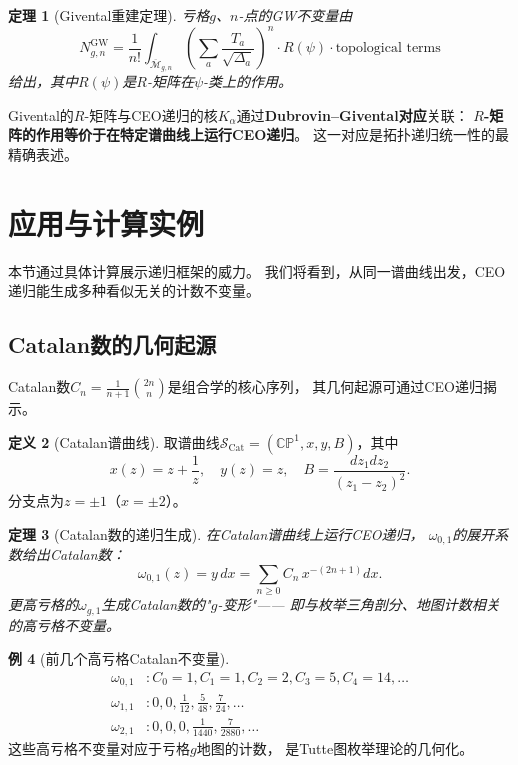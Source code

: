 \documentclass[11pt,a4paper]{article}
\theoremstyle{plain}
\newtheorem{theorem}{定理}[section]
\theoremstyle{definition}
\newtheorem{definition}[theorem]{定义}
\newtheorem{example}[theorem]{例}
\newcommand{\CP}{\mathbb{CP}}
\newcommand{\Mbar}{\overline{\mathcal{M}}}
\newcommand{\GWinv}{N^{\mathrm{GW}}}
\begin{document}
\begin{theorem}[Givental重建定理]\label{thm:givental}
亏格$g$、$n$-点的GW不变量由
\[
\GWinv_{g,n} = \frac{1}{n!} \int_{\Mbar_{g,n}}
\left( \sum_a \frac{T_a}{\sqrt{\Delta_a}} \right)^n
\cdot R(\psi) \cdot \text{topological terms}
\]
给出，其中$R(\psi)$是$R$-矩阵在$\psi$-类上的作用。
\end{theorem}

Givental的$R$-矩阵与CEO递归的核$K_\alpha$通过\textbf{Dubrovin--Givental对应}关联：
\textbf{$R$-矩阵的作用等价于在特定谱曲线上运行CEO递归}。
这一对应是拓扑递归统一性的最精确表述。




\section{应用与计算实例}\label{sec:apps}

本节通过具体计算展示递归框架的威力。
我们将看到，从同一谱曲线出发，CEO递归能生成多种看似无关的计数不变量。

\subsection{Catalan数的几何起源}

Catalan数$C_n = \frac{1}{n+1}\binom{2n}{n}$是组合学的核心序列，
其几何起源可通过CEO递归揭示。

\begin{definition}[Catalan谱曲线]\label{def:catalan}
取谱曲线$\mathcal{S}_{\mathrm{Cat}} = (\CP^1, x, y, B)$，其中
\[
x(z) = z + \frac{1}{z}, \quad y(z) = z, \quad B = \frac{dz_1 dz_2}{(z_1 - z_2)^2}.
\]
分支点为$z = \pm 1$（$x = \pm 2$）。
\end{definition}

\begin{theorem}[Catalan数的递归生成]\label{thm:catalan}
在Catalan谱曲线上运行CEO递归，
$\omega_{0,1}$的展开系数给出Catalan数：
\[
\omega_{0,1}(z) = y \, dx = \sum_{n \geq 0} C_n \, x^{-(2n+1)} dx.
\]
更高亏格的$\omega_{g,1}$生成Catalan数的"$g$-变形"——
即与枚举三角剖分、地图计数相关的高亏格不变量。
\end{theorem}

\begin{example}[前几个高亏格Catalan不变量]\label{ex:catalan}
\begin{align*}
\omega_{0,1} &: C_0 = 1, C_1 = 1, C_2 = 2, C_3 = 5, C_4 = 14, \ldots \\
\omega_{1,1} &: 0, 0, \frac{1}{12}, \frac{5}{48}, \frac{7}{24}, \ldots \\
\omega_{2,1} &: 0, 0, 0, \frac{1}{1440}, \frac{7}{2880}, \ldots
\end{align*}
这些高亏格不变量对应于亏格$g$地图的计数，
是Tutte图枚举理论的几何化。
\end{example}
\end{document}
